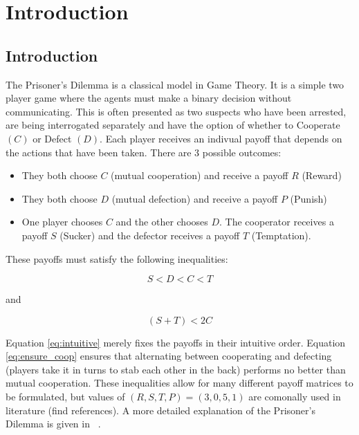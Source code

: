 
\chapter{Introduction}\label{cha:introduction}

\section{Introduction}

The Prisoner's Dilemma is a classical model in Game Theory.
It is a simple two player game where the agents must make a binary decision without communicating.
This is often presented as two suspects who have been arrested, are being interrogated separately and have the option of whether to Cooperate $(C)$ or Defect $(D)$.
Each player receives an indivual payoff that depends on the actions that have been taken.
There are 3 possible outcomes:

\begin{itemize}  
\item They both choose $C$ (mutual cooperation) and receive a payoff $R$ (Reward)
\item They both choose $D$ (mutual defection) and receive a payoff $P$ (Punish)
\item One player chooses $C$ and the other chooses $D$. The cooperator receives a payoff $S$ (Sucker) and the defector receives a payoff $T$ (Temptation).
\end{itemize}

These payoffs must satisfy the following inequalities:

\begin{equation}\label{eq:intuitive}
S < D < C < T
\end{equation}

and

\begin{equation}\label{eq:ensure_coop}
(S + T) < 2 C
\end{equation}

Equation \ref{eq:intuitive} merely fixes the payoffs in their intuitive order.
Equation \ref{eq:ensure_coop} ensures that alternating between cooperating and defecting (players take it in turns to stab each other in the back) performs no better than mutual cooperation.
These inequalities allow for many different payoff matrices to be formulated, but values of $(R, S, T, P) = (3, 0, 5, 1)$ are comonally used in literature (find references).
A more detailed explanation of the Prisoner's Dilemma is given in ~\cite{Gotts2003}.

